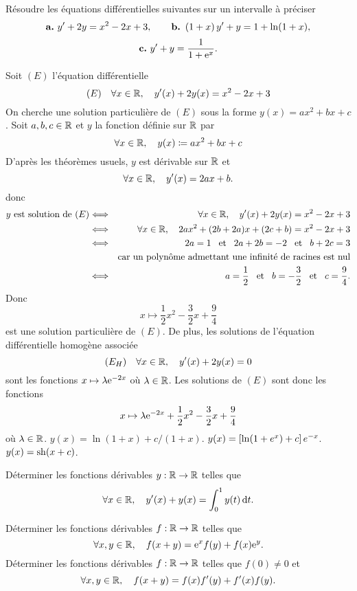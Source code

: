 \documentclass{magnolia}
\begin{document}
Résoudre les équations différentielles suivantes sur un intervalle à préciser
\[\textbf{a.}\ y'+2y=x^2-2x+3, \qquad
\textbf{b.}\ \left(1+x\right)y'+y=1+\ln (1+x),\]
\[\textbf{c.}\ y'+y=\frac{1}{1+{\rm e}^x}.\]
\begin{sol}
\begin{questions}
\question Soit $(E)$ l'équation différentielle
 \[(E) \quad \forall x\in\mathbb{R},\quad y'(x)+2y(x)=x^2-2x+3\]
 On cherche une solution particulière de $(E)$ sous la forme $y(x)=ax^2+bx+c$. Soit $a, b, c\in\mathbb{R}$ et $y$ la fonction définie sur $\mathbb{R}$ par
 \[\forall x\in\mathbb{R} ,\quad y(x)\coloneqq ax^2+bx+c\]
 D'après les théorèmes usuels, $y$ est dérivable sur $\mathbb{R}$ et
\[\forall x\in\mathbb{R},\quad y'(x)= 2ax+b.\]
donc
\begin{eqnarray*}
\text{$y$ est solution de $(E)$}
&\ssi& \forall x\in\R\qsep y'(x)+2y(x)=x^2-2x+3\\
&\ssi& \forall x\in\R\qsep 2ax^2+(2b+2a)x+(2c+b)=x^2-2x+3\\
&\ssi& 2a = 1 \et 2a+2b=-2 \et b+2c=3\\
&    & \text{car un polynôme admettant une infinité de racines est nul}\\
&\ssi& a = \frac{1}{2} \et b=-\frac{3}{2} \et c=\frac{9}{4}.
\end{eqnarray*}
Donc
\[x\mapsto \frac{1}{2}x^2-\frac{3}{2}x+\frac{9}{4}\]
est une solution particulière de $(E)$. De plus, les solutions de l'équation différentielle homogène associée
\[(E_H) \quad \forall x\in\mathbb{R},\quad y'(x)+2y(x)=0\]
sont les fonctions $x\mapsto \lambda{\rm e}^{-2x}$ où $\lambda\in\mathbb{R}$. Les solutions de $(E)$ sont donc les fonctions
\[x\mapsto \lambda{\rm e}^{-2x}+\frac{1}{2}x^2-\frac{3}{2}x+\frac{9}{4}\]
où $\lambda\in\mathbb{R}$.
\question $y(x)=\ln(1+x)+c/(1+x)$.
\question $y(x)=\left[\ln(1+e^x)+c\right]e^{-x}$.
\question $y(x)=\operatorname{sh}(x+c)$.
\end{questions}
\end{sol}

Déterminer les fonctions dérivables $y:\mathbb{R}\to\mathbb{R}$ telles que
\[\forall x\in\mathbb{R},\quad y'(x)+y(x)=\int_{0}^{1} y(t)\,\text{d}t.\]

\begin{questions}
\question Déterminer les fonctions dérivables $f:\mathbb{R}\to\mathbb{R}$ telles que
\[\forall x,y\in\mathbb{R},\quad f(x+y)={\rm e}^x f(y)+f(x){\rm e}^y.\]
\question Déterminer les fonctions dérivables $f:\mathbb{R}\to\mathbb{R}$ telles que $f(0)\neq 0$ et
\[\forall x,y\in\mathbb{R},\quad f(x+y)=f(x)f'(y)+f'(x)f(y).\]
\end{questions}
\end{document}
